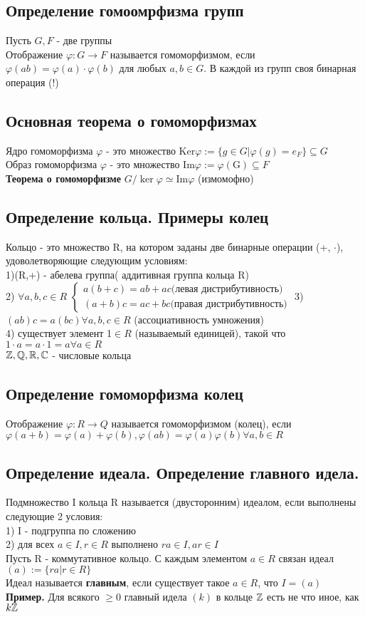 \subsection{Определение гомоомрфизма групп}
Пусть $ G, F$ - две группы \\
Отображение $ \varphi: G\to F$ называется гомоморфизмом, если $\varphi(ab) = \varphi(a)\cdot\varphi(b)$ для любых $a,b \in G$. В каждой из групп своя бинарная операция (!)
\subsection{Основная теорема о гомоморфизмах}
Ядро гомоморфизма $\varphi$ - это множество Ker$\varphi:=\{g\in G|\varphi(g) = e_{F}\}\subseteq G$\\
Образ гомоморфизма $\varphi$ - это множество Im$\varphi:=\varphi(\text{G})\subseteq F$\\
\textbf{Теорема о гомоморфизме} $G/\ker\varphi \simeq \text{Im}\varphi$ (измомофно)
\subsection{Определение кольца. Примеры колец}
Кольцо - это множество R, на котором заданы две бинарные операции (+, $\cdot$), удоволетворяющие следующим условиям: \\
1)(R,+) - абелева группа( аддитивная группа кольца R) \\
2) $\forall a,b,c \in R$ $\begin{cases} a(b+c) = ab+ac \text{(левая дистрибутивность)} \\
	(a+b)c = ac + bc \text{(правая дистрибутивность)}
\end{cases}$
3) $(ab)c = a(bc) \forall a,b,c \in R$ (ассоциативность умножения)\\
4) существует элемент 1$\in R$ (называемый единицей), такой что $1\cdot a = a\cdot 1= a \forall a\in R$\\
$\mathbb{Z}, \mathbb{Q}, \mathbb{R}, \mathbb{C}$ - числовые кольца\\
\subsection{Определение гомоморфизма колец}
Отображение $\varphi: R\to Q$ называется гомоморфизмом (колец), если $\varphi(a+b) = \varphi(a) +\varphi(b),\varphi(ab) = \varphi(a)\varphi(b) \forall a,b\in R$
\subsection{Определение идеала. Определение главного идела.}
Подмножество I кольца R называется (двусторонним) идеалом, если выполнены следующие 2 условия: \\
1) I - подгруппа по сложению \\
2) для всех $a\in I, r\in R$ выполнено $ra\in I, ar\in I$\\
Пусть R - коммутативное кольцо. С каждым элементом $a\in R$ связан идеал $(a):=\{ra| r\in R\}$\\
Идеал называется \textbf{главным}, если существует такое $a\in R$, что $I = (a)$\\
\textbf{Пример.} Для всякого $\geqslant0$ главный идела $(k)$ в кольце $\mathbb{Z}$ есть не что иное, как $k\mathbb{Z}$\\
